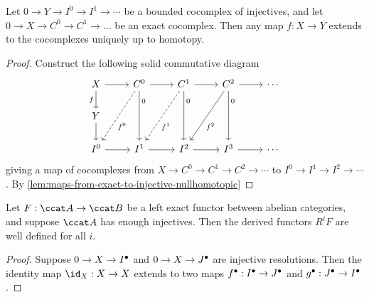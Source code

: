 \begin{cor}
	Let $0 \to Y \to I^0 \to I^1 \to \cdots$ be a bounded cocomplex of injectives, and let $0 \to X \to C^0 \to C^1 \to ...$ be an exact cocomplex. Then any map $f: X \to Y$ extends to the cocomplexes uniquely up to homotopy. 
\end{cor}
\begin{proof}
Construct the following solid commutative diagram 	
\[\begin{tikzcd}
	X & {C^0} & {C^1} & {C^2} & \cdots \\
	Y \\
	{I^0} & {I^1} & {I^2} & {I^3} & \cdots
	\arrow[from=1-1, to=1-2]
	\arrow["f"', from=1-1, to=2-1]
	\arrow[from=1-2, to=1-3]
	\arrow["{f^0}"{pos=0.6}, dashed, from=1-2, to=3-1]
	\arrow["0"{pos=0.2}, from=1-2, to=3-2]
	\arrow[from=1-3, to=1-4]
	\arrow["{f^1}"{pos=0.6}, dashed, from=1-3, to=3-2]
	\arrow["0"{pos=0.2}, from=1-3, to=3-3]
	\arrow[from=1-4, to=1-5]
	\arrow["{f^2}"{pos=0.6}, from=1-4, to=3-3]
	\arrow["0"{pos=0.2}, from=1-4, to=3-4]
	\arrow[from=2-1, to=3-1]
	\arrow[from=3-1, to=3-2]
	\arrow[from=3-2, to=3-3]
	\arrow[from=3-3, to=3-4]
	\arrow[from=3-4, to=3-5]
\end{tikzcd}\]
giving a map of cocomplexes from $X \to C^0 \to C^1 \to C^2 \to \cdots$ to $I^0 \to I^1 \to I^2 \to \cdots$. 
By \cref{lem:maps-from-exact-to-injective-nullhomotopic} 
\end{proof}

\begin{cor}
	Let $F: \ccat A \to \ccat B$ be a left exact functor between abelian categories, and suppose $\ccat A$ has enough injectives. Then the derived functors $R^iF$ are well defined for all $i$. 
\end{cor}
\begin{proof}
	Suppose $0 \to X \to {I}^\bullet$ and $0 \to X \to {J}^\bullet$ are injective resolutions. Then the identity map $\id_X: X \to X$ extends to two maps ${f}^\bullet: {I}^\bullet \to {J}^\bullet$ and ${g}^\bullet: {J}^\bullet \to {I}^\bullet$. 
\end{proof}
